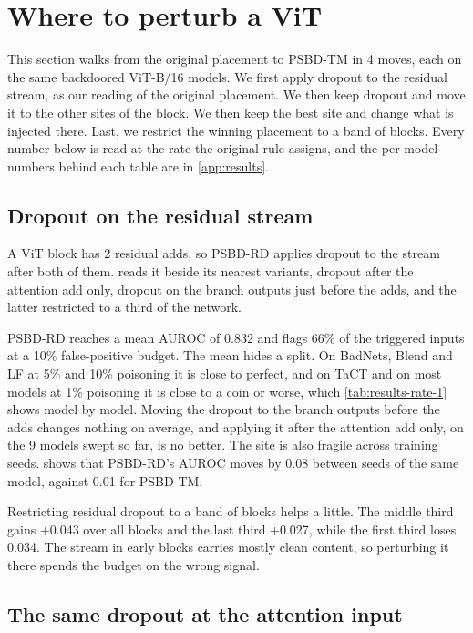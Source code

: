 \section{Where to perturb a ViT}
\label{sec:results}

This section walks from the original placement to PSBD-TM in 4 moves, each on the same backdoored ViT-B/16 models. We first apply dropout to the residual stream, as our reading of the original placement. We then keep dropout and move it to the other sites of the block. We then keep the best site and change what is injected there. Last, we restrict the winning placement to a band of blocks. Every number below is read at the rate the original rule assigns, and the per-model numbers behind each table are in \cref{app:results}.

\subsection{Dropout on the residual stream}
\label{sec:results:residual}

A ViT block has 2 residual adds, so PSBD-RD applies dropout to the stream after both of them.  reads it beside its nearest variants, dropout after the attention add only, dropout on the branch outputs just before the adds, and the latter restricted to a third of the network.



PSBD-RD reaches a mean AUROC of 0.832 and flags 66\% of the triggered inputs at a 10\% false-positive budget. The mean hides a split. On BadNets, Blend and LF at 5\% and 10\% poisoning it is close to perfect, and on TaCT and on most models at 1\% poisoning it is close to a coin or worse, which \cref{tab:results-rate-1} shows model by model. Moving the dropout to the branch outputs before the adds changes nothing on average, and applying it after the attention add only, on the 9 models swept so far, is no better. The site is also fragile across training seeds.  shows that PSBD-RD's AUROC moves by 0.08 between seeds of the same model, against 0.01 for PSBD-TM.

Restricting residual dropout to a band of blocks helps a little. The middle third gains +0.043 over all blocks and the last third +0.027, while the first third loses 0.034. The stream in early blocks carries mostly clean content, so perturbing it there spends the budget on the wrong signal.

\subsection{The same dropout at the attention input}
\label{sec:results:sites}

